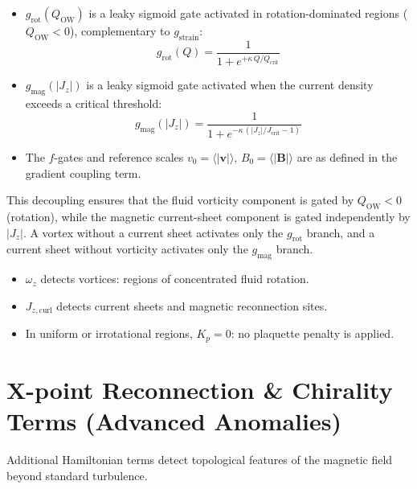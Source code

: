 \documentclass[12pt, a4paper, oneside]{report}
\begin{document}
\begin{itemize}
    \item $g_{\text{rot}}(Q_{\text{OW}})$ is a leaky sigmoid gate activated in rotation-dominated regions ($Q_{\text{OW}} < 0$), complementary to $g_{\text{strain}}$:
    \begin{equation}
        g_{\text{rot}}(Q) = \frac{1}{1 + e^{+\kappa \, Q / Q_{\text{crit}}}}
    \end{equation}
    \item $g_{\text{mag}}(|J_z|)$ is a leaky sigmoid gate activated when the current density exceeds a critical threshold:
    \begin{equation}
        g_{\text{mag}}(|J_z|) = \frac{1}{1 + e^{-\kappa \, (|J_z| / J_{\text{crit}} - 1)}}
    \end{equation}
    \item The $f$-gates and reference scales $v_0 = \langle |\mathbf{v}| \rangle$, $B_0 = \langle |\mathbf{B}| \rangle$ are as defined in the gradient coupling term.
\end{itemize}
This decoupling ensures that the fluid vorticity component is gated by $Q_{\text{OW}} < 0$ (rotation), while the magnetic current-sheet component is gated independently by $|J_z|$. A vortex without a current sheet activates only the $g_{\text{rot}}$ branch, and a current sheet without vorticity activates only the $g_{\text{mag}}$ branch.
\begin{itemize}
    \item $\omega_z$ detects vortices: regions of concentrated fluid rotation.
    \item $J_{z,\text{curl}}$ detects current sheets and magnetic reconnection sites.
    \item In uniform or irrotational regions, $K_p = 0$: no plaquette penalty is applied.
\end{itemize}

\section{X-point Reconnection \& Chirality Terms (Advanced Anomalies)}
\label{sec:xpoint-detection}
Additional Hamiltonian terms detect topological features of the magnetic field beyond standard turbulence.
\end{document}
